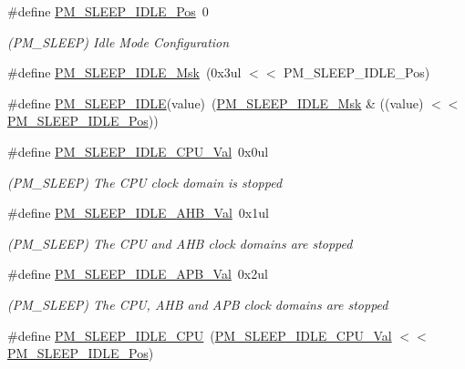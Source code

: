 \begin{DoxyCompactItemize}
\#define \mbox{\hyperlink{group___s_a_m_d21___p_m_gaa2d182f036730a59ef2da72b5b0e618a}{P\+M\+\_\+\+S\+L\+E\+E\+P\+\_\+\+I\+D\+L\+E\+\_\+\+Pos}}~0
\begin{DoxyCompactList}\small\item\em (P\+M\+\_\+\+S\+L\+E\+EP) Idle Mode Configuration \end{DoxyCompactList}\item 
\#define \mbox{\hyperlink{group___s_a_m_d21___p_m_ga1e037abe2f7d3bb76b2197bb252dc03a}{P\+M\+\_\+\+S\+L\+E\+E\+P\+\_\+\+I\+D\+L\+E\+\_\+\+Msk}}~(0x3ul $<$$<$ P\+M\+\_\+\+S\+L\+E\+E\+P\+\_\+\+I\+D\+L\+E\+\_\+\+Pos)
\item 
\#define \mbox{\hyperlink{group___s_a_m_d21___p_m_ga624dad2f7e3ebc6a04ec0fcdf3072de5}{P\+M\+\_\+\+S\+L\+E\+E\+P\+\_\+\+I\+D\+LE}}(value)~(\mbox{\hyperlink{group___s_a_m_d21___p_m_ga1e037abe2f7d3bb76b2197bb252dc03a}{P\+M\+\_\+\+S\+L\+E\+E\+P\+\_\+\+I\+D\+L\+E\+\_\+\+Msk}} \& ((value) $<$$<$ \mbox{\hyperlink{group___s_a_m_d21___p_m_gaa2d182f036730a59ef2da72b5b0e618a}{P\+M\+\_\+\+S\+L\+E\+E\+P\+\_\+\+I\+D\+L\+E\+\_\+\+Pos}}))
\item 
\#define \mbox{\hyperlink{group___s_a_m_d21___p_m_ga7cc0377b2ef6038f5d801cc0d4e29123}{P\+M\+\_\+\+S\+L\+E\+E\+P\+\_\+\+I\+D\+L\+E\+\_\+\+C\+P\+U\+\_\+\+Val}}~0x0ul
\begin{DoxyCompactList}\small\item\em (P\+M\+\_\+\+S\+L\+E\+EP) The C\+PU clock domain is stopped \end{DoxyCompactList}\item 
\#define \mbox{\hyperlink{group___s_a_m_d21___p_m_ga11a1887faf287193d41aa8627e361f1f}{P\+M\+\_\+\+S\+L\+E\+E\+P\+\_\+\+I\+D\+L\+E\+\_\+\+A\+H\+B\+\_\+\+Val}}~0x1ul
\begin{DoxyCompactList}\small\item\em (P\+M\+\_\+\+S\+L\+E\+EP) The C\+PU and A\+HB clock domains are stopped \end{DoxyCompactList}\item 
\#define \mbox{\hyperlink{group___s_a_m_d21___p_m_ga7459e8643971963deab04fb2a7868257}{P\+M\+\_\+\+S\+L\+E\+E\+P\+\_\+\+I\+D\+L\+E\+\_\+\+A\+P\+B\+\_\+\+Val}}~0x2ul
\begin{DoxyCompactList}\small\item\em (P\+M\+\_\+\+S\+L\+E\+EP) The C\+PU, A\+HB and A\+PB clock domains are stopped \end{DoxyCompactList}\item 
\#define \mbox{\hyperlink{group___s_a_m_d21___p_m_ga59b7470b6354d3ef09b08dd492622dd2}{P\+M\+\_\+\+S\+L\+E\+E\+P\+\_\+\+I\+D\+L\+E\+\_\+\+C\+PU}}~(\mbox{\hyperlink{group___s_a_m_d21___p_m_ga7cc0377b2ef6038f5d801cc0d4e29123}{P\+M\+\_\+\+S\+L\+E\+E\+P\+\_\+\+I\+D\+L\+E\+\_\+\+C\+P\+U\+\_\+\+Val}}         $<$$<$ \mbox{\hyperlink{group___s_a_m_d21___p_m_gaa2d182f036730a59ef2da72b5b0e618a}{P\+M\+\_\+\+S\+L\+E\+E\+P\+\_\+\+I\+D\+L\+E\+\_\+\+Pos}})
$$
\end{DoxyCompactItemize}
